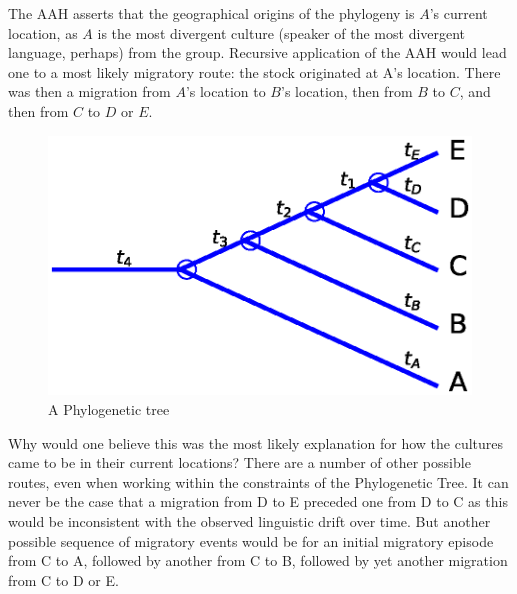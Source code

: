\documentclass[11pt]{article}
\begin{document}
The AAH asserts that the geographical origins of the phylogeny is $A$'s current location, as $A$  is the most divergent culture (speaker of the most divergent language, perhaps) from the group. Recursive application of the AAH would lead one to a most likely migratory route: the stock originated at A's location. There was then a migration from $A$'s location to $B$'s location, then from $B$ to $C$, and then from $C$ to $D$ or $E$.  

\begin{figure}
\begin{center}
\includegraphics[width=\textwidth]{AncillaryFiles//figure1.eps}
\caption{A Phylogenetic tree} \label{fig1}
\end{center} 
\end{figure}

Why would one believe this was the most likely explanation for how the cultures came to be in their current locations? There are a number of other possible routes, even when working within the constraints of the Phylogenetic Tree. It can never be the case that a migration from D to E preceded one from D to C as this would be inconsistent with the observed linguistic drift over time. But another possible  sequence of migratory events would be for an initial migratory episode from C to A, followed by another from C to B, followed by yet another migration from C to D or E.
\end{document}
